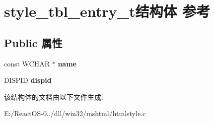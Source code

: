 \hypertarget{structstyle__tbl__entry__t}{}\section{style\+\_\+tbl\+\_\+entry\+\_\+t结构体 参考}
\label{structstyle__tbl__entry__t}
\subsection*{Public 属性}
\begin{DoxyCompactItemize}
\item 
\mbox{\label{structstyle__tbl__entry__t_ab77e91086d71c2b0eb8a64382c4e4981}} 
const W\+C\+H\+AR $\ast$ {\bfseries name}
\item 
\mbox{\label{structstyle__tbl__entry__t_a84e07bcce31b83ad5dc63f9ec395cfaa}} 
D\+I\+S\+P\+ID {\bfseries dispid}
\end{DoxyCompactItemize}


该结构体的文档由以下文件生成\+:\begin{DoxyCompactItemize}
\item 
E\+:/\+React\+O\+S-\/0../dll/win32/mshtml/htmlstyle.\+c\end{DoxyCompactItemize}
